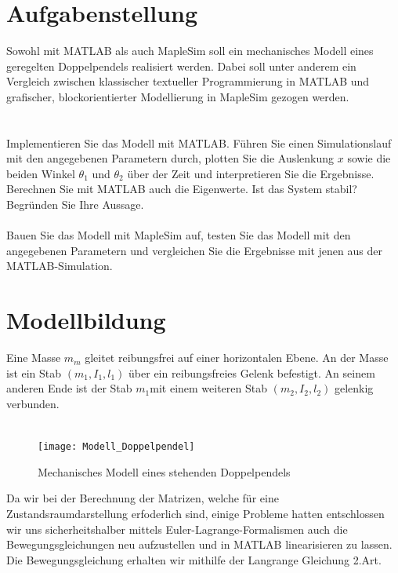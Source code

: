 \documentclass[a4paper, 10pt]{report}
\begin{document}
\chapter{Aufgabenstellung}
\renewcommand{\thechapter}{1}
Sowohl mit MATLAB als auch MapleSim soll ein mechanisches Modell eines geregelten Doppelpendels realisiert werden. Dabei soll unter anderem ein Vergleich zwischen klassischer textueller Programmierung in MATLAB und grafischer, blockorientierter Modellierung in MapleSim gezogen werden.
\\
\\
\\Implementieren Sie das Modell mit MATLAB. Führen Sie einen Simulationslauf mit den angegebenen Parametern durch, plotten Sie die Auslenkung $x$ sowie die beiden Winkel $\theta_{1}$ und $\theta_{2}$ über der Zeit und interpretieren Sie die Ergebnisse. Berechnen Sie mit MATLAB auch die Eigenwerte. Ist das System stabil? Begründen Sie Ihre Aussage.
\\
\\
Bauen Sie das Modell mit MapleSim auf, testen Sie das Modell mit den angegebenen Parametern und vergleichen Sie die Ergebnisse mit jenen aus der MATLAB-Simulation.

\renewcommand{\thechapter}{} %
\chapter{Modellbildung}
\renewcommand{\thechapter}{2}

Eine Masse $ m_{m} $ gleitet reibungsfrei auf einer horizontalen Ebene. An der Masse ist ein Stab $ (m_{1}, I_{1}, l_{1}) $ über ein reibungsfreies Gelenk befestigt. An seinem anderen Ende ist der Stab $m_{1} $mit einem weiteren Stab $ (m_{2}, I_{2}, l_{2}) $ gelenkig verbunden.
\\
\\
\begin{figure}[h]
\centering  %
{\texttt{[image: Modell\_Doppelpendel]}}
\caption{Mechanisches Modell eines stehenden Doppelpendels}
\end{figure}
\noindent

Da wir bei der Berechnung der Matrizen, welche für eine Zustandsraumdarstellung erfoderlich sind, einige Probleme hatten entschlossen wir uns sicherheitshalber mittels Euler-Lagrange-Formalismen auch die Bewegungsgleichungen neu aufzustellen und in MATLAB linearisieren zu lassen. Die Bewegungsgleichung erhalten wir mithilfe der Langrange Gleichung 2.Art.
\end{document}
